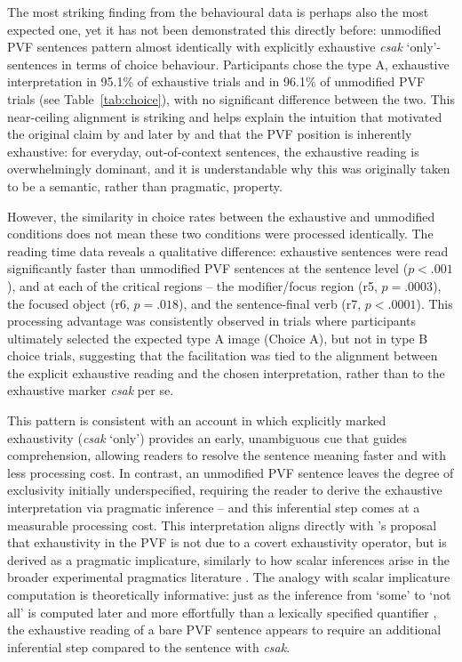 \documentclass[a4paper, ruler]{CUP-JNL-LIN}%
\begin{document}
The most striking finding from the behavioural data is perhaps also the most expected one, yet it has not been demonstrated this directly before: unmodified PVF sentences pattern almost identically with explicitly exhaustive \textit{csak} `only'-sentences in terms of choice behaviour. Participants chose the type A, exhaustive interpretation in 95.1\% of exhaustive trials and in 96.1\% of unmodified PVF trials (see Table~\ref{tab:choice}), with no significant difference between the two. This near-ceiling alignment is striking and helps explain the intuition that motivated the original claim by \citet{ekiss_1998_identificational} and later by \citet{szabolcsi_1981_compositionality} and \citet{kenesei_2006_focus} that the PVF position is inherently exhaustive: for everyday, out-of-context sentences, the exhaustive reading is overwhelmingly dominant, and it is understandable why this was originally taken to be a semantic, rather than pragmatic, property.

However, the similarity in choice rates between the exhaustive and unmodified conditions does not mean these two conditions were processed identically. The reading time data reveals a qualitative difference: exhaustive sentences were read significantly faster than unmodified PVF sentences at the sentence level ($p < .001$), and at each of the critical regions -- the modifier/focus region (r5, $p = .0003$), the focused object (r6, $p = .018$), and the sentence-final verb (r7, $p < .0001$). This processing advantage was consistently observed in trials where participants ultimately selected the expected type A image (Choice A), but not in type B choice trials, suggesting that the facilitation was tied to the alignment between the explicit exhaustive reading and the chosen interpretation, rather than to the exhaustive marker \textit{csak} per se.

This pattern is consistent with an account in which explicitly marked exhaustivity (\textit{csak} `only') provides an early, unambiguous cue that guides comprehension, allowing readers to resolve the sentence meaning faster and with less processing cost. In contrast, an unmodified PVF sentence leaves the degree of exclusivity initially underspecified, requiring the reader to derive the exhaustive interpretation via pragmatic inference -- and this inferential step comes at a measurable processing cost. This interpretation aligns directly with \citet{balogh_2013_hungarian}'s proposal that exhaustivity in the PVF is not due to a covert exhaustivity operator, but is derived as a pragmatic implicature, similarly to how scalar inferences arise in the broader experimental pragmatics literature \citep[cf.][]{kaldi_2018_linguistic}. The analogy with scalar implicature computation is theoretically informative: just as the inference from `some' to `not all' is computed later and more effortfully than a lexically specified quantifier \citep[cf.][]{kaldi_2021_hungarian_structural}, the exhaustive reading of a bare PVF sentence appears to require an additional inferential step compared to the sentence with \textit{csak}.
\end{document}
